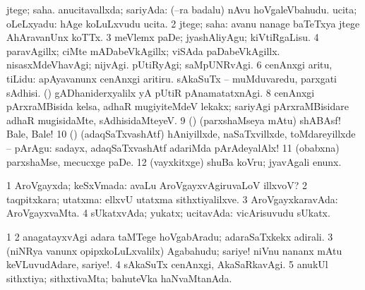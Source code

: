 {{{\noindent 
\gl{\pagu}
\expl{}
\bmng
\bnum
{}  
\banum
{} jtege; saha. 
 anucitavallxda; sariyAda:  (--ra badalu) nAvu hoVgaleVbahudu. 
 ucita; oLeLxyadu:  hAge koLuLxvudu ucita. 
\eanum
\numie
\num{2}  jtege; saha:  avanu nanage baTeTxya jtege AhAravanUnx koTTx. 
\num{3}  meVlemx paDe; jyashAliyAgu; kiVtiRgaLisu. 
\num{4}  paravAgillx; ciMte mADabeVkAgillx; viSAda paDabeVkAgillx. 
  
\banum
{} nisasxMdeVhavAgi; nijvAgi. 
 pUtiRyAgi; saMpUNRvAgi. 
\eanum
\numie
\num{6}  cenAnxgi aritu, tiLidu:  apAyavanunx cenAnxgi aritiru. 
  
\banum
{} sAkaSuTx -- muMduvaredu, parxgati sAdhisi. 
 (\AmA) gADhaniderxyalilx yA pUtiR pAnamatatxnAgi. 
\eanum
\numie
\num{8} cenAnxgi pArxraMBisida kelsa, adhaR mugiyiteMdeV lekakx; sariyAgi pArxraMBisidare adhaR mugisidaMte, sAdhisidaMteyeV. 
\num{9}  () (parxshaMseya mAtu) shABAsf! Bale, Bale! 
\num{10}  () (adaqSaTxvashAtf) hAniyillxde, naSaTxvillxde, toMdareyillxde -- pArAgu:  sadayx, adaqSaTxvashAtf adariMda pArAdeyalAlx! 
\num{11}  (obabxna) parxshaMse, mecucxge paDe. 
\num{12}  (vayxkitxge) shuBa koVru; jyavAgali enunx. 
\enum
\emng
\eentry

\bentry
{} 
\gl{\gu}
\bmng
\bnum
\num{1} AroVgayxda; keSxVmada:  avaLu AroVgayxvAgiruvaLoV illxvoV? 
\num{2} taqpitxkara; utatxma:  ellxvU utatxma sithxtiyalilxve. 
\num{3} AroVgayxkaravAda:  AroVgayxvaMta. 
\num{4} sUkatxvAda; yukatx; ucitavAda:  vicArisuvudu sUkatx. 
\enum
\emng

\noindent 
\gl{\pagu}
\expl{}
\bmng
\bnum
\num{1}  
\num{2}  anagatayxvAgi adara taMTege hoVgabAradu; adaraSaTxkekx adirali. 
\num{3}  (niNRya \mo vanunx opipxkoLuLxvalilx) Agabahudu; sariye!  niVnu nananx mAtu keVLuvudAdare, sariye!. 
\num{4}  sAkaSuTx cenAnxgi, AkaSaRkavAgi. 
\num{5}  anukUl sithxtiya; sithxtivaMta; bahuteVka haNvaMtanAda. 
\enum
\emng
\eentry

}}}
